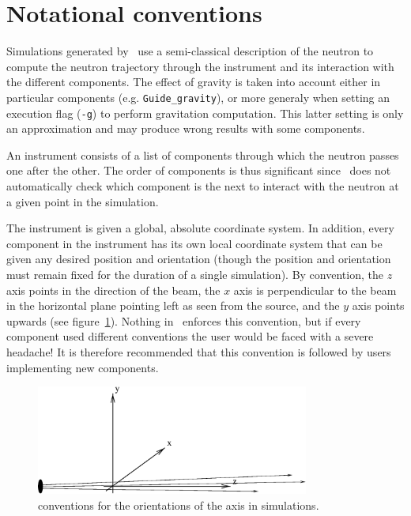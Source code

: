 \section{Notational conventions}

Simulations generated by \MCS\ use a semi-classical description of the
neutron to compute the neutron trajectory through the instrument and its
interaction with the different components. The effect of gravity is
taken  into account either in particular components (e.g. \verb+Guide_gravity+), or more generaly
when setting an execution flag (\verb+-g+) to perform gravitation
computation. This latter setting is only an approximation and may produce
wrong results with some components.

An instrument consists of a list of components through which the neutron
passes one after the other. The order of components is thus significant
since \MCS\ does not automatically check which component is the next to
interact with the neutron at a given point in the simulation.

The instrument is given a global, absolute coordinate system. In
addition, every component in the instrument has its own local coordinate
system that can be given any desired position and orientation (though
the position and orientation must remain fixed for the duration of a
single simulation). 
By convention, the $z$ axis points in the direction of the beam, the $x$ axis
is perpendicular to the beam in the horizontal plane pointing left as seen
from the source, and the $y$ axis points upwards (see figure~\ref{f:axis}).
Nothing in \MCS\ enforces this convention, but if every component used
different conventions the user would be faced with a severe headache! It is
therefore recommended that this convention is followed by users implementing
new components.
\begin{figure}
  \begin{center}
    \includegraphics[width=0.8\textwidth]{figures/axis-conventions.eps}
  \end{center}
\caption{conventions for the orientations of the axis in simulations.}
\label{f:axis}
\end{figure}

